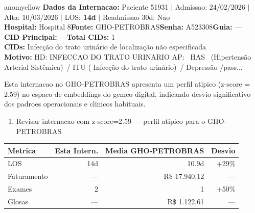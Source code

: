 \documentclass[a4paper,10pt]{article}
\begin{document}
\begin{anomalycard}[Internacao 166687 | GHO-PETROBRAS | MODERADO (z=2.59)]{anomyellow}
\textbf{Dados da Internacao:} Paciente 51931 $\mid$ Admissao: 24/02/2026 $\mid$ Alta: 10/03/2026 $\mid$ LOS: \textbf{14d} $\mid$ Readmissao 30d: Nao\\
\textbf{Hospital:} Hospital 8\quad\textbf{Fonte:} GHO-PETROBRAS\quad\textbf{Senha:} A523308\quad\textbf{Guia:} ---\\
\textbf{CID Principal:} {\small ---}\quad\textbf{Total CIDs:} 1\\

\textbf{CIDs:} {\scriptsize Infecção do trato urinário de localização não especificada}\\

\textbf{Motivo:} {\scriptsize HD: INFECCAO DO TRATO URINARIO  AP:  HAS  (Hipertensão Arterial Sistêmica) / ITU ( Infecção do trato urinário) / Depressão /pass...}\\

\vspace{2pt}\begin{tcolorbox}[colback=severityred!20,colframe=anomyellow,title={\textbf{Interpretacao de Negocio}},fonttitle=\bfseries\small,left=4pt,right=4pt,top=3pt,bottom=3pt]
{\small Esta internacao no GHO-PETROBRAS apresenta um perfil atipico (z-score = 2.59) no espaco de embeddings do gemeo digital, indicando desvio significativo dos padroes operacionais e clinicos habituais.}
\end{tcolorbox}
\begin{tcolorbox}[colback=severityyellow!30,colframe=anomorange,title={\textbf{Recomendacoes Especificas}},fonttitle=\bfseries\small,left=4pt,right=4pt,top=3pt,bottom=3pt]
\begin{enumerate}[nosep,leftmargin=16pt]
\item {\small Revisar internacao com z-score=2.59 --- perfil atipico para o GHO-PETROBRAS}
\end{enumerate}
\end{tcolorbox}
\begin{center}\begin{tabular}{l r r r}\toprule\textbf{Metrica} & \textbf{Esta Intern.} & \textbf{Media GHO-PETROBRAS} & \textbf{Desvio} \\\midrule
LOS & 14d & 10.9d & +29\% \\
Faturamento & --- & R\$ 17.940,12 & --- \\
Exames & 2 & 1 & \textcolor{anomorange}{+50\%} \\
Glosas & --- & R\$ 1.122,61 & --- \\
\bottomrule\end{tabular}\end{center}


\end{anomalycard}
\end{document}
